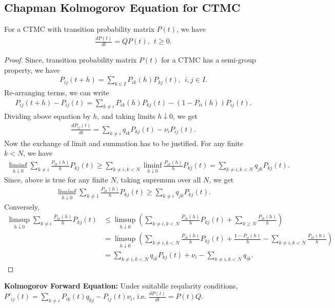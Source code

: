 \documentclass[a4paper,10pt,english]{article}
\begin{document}
\subsection{Chapman Kolmogorov Equation for CTMC}
\begin{thm} For a CTMC with transition probability matrix $P(t)$, we have
\begin{align*}
\frac{dP(t)}{dt}=QP(t), ~~t \geqslant 0.
\end{align*}
\end{thm}
\begin{proof} Since, transition probability matrix $P(t)$ for a CTMC has a semi-group property, we have
\begin{align*}
P_{ij}(t+h)=\sum_{k \in I}P_{ik}(h)P_{kj}(t),~~i,j \in I.
\end{align*}
Re-arranging terms, we can write
\begin{align*}
P_{ij}(t+h)-P_{ij}(t)=\sum_{k \neq i}P_{ik}(h)P_{kj}(t)-(1-P_{ii}(h))P_{ij}(t).
\end{align*}
Dividing above equation by $h$,  and taking limits $h \downarrow 0$, we get 
\begin{align*}
\frac{dP_{ij}(t)}{dt} = \sum_{k \neq i}q_{ik}P_{kj}(t)-\nu_iP_{ij}(t). 
\end{align*}
Now the exchange of limit and summation has to be justified. For any finite $k < N$, we have
\begin{align*}
\liminf_{h \downarrow 0} \sum_{k \neq i}\frac{P_{ik}(h)}{h}P_{kj}(t) \geq \sum_{k \neq i, k < N}\liminf_{h \downarrow 0}\frac{P_{ik}(h)}{h}P_{kj}(t) = \sum_{k \neq i, k < N}q_{jk}P_{kj}(t).
\end{align*}
Since, above is true for any finite $N$, taking supremum over all $N$, we get 
\begin{align*}
\liminf_{h \downarrow 0} \sum_{k \neq 1}\frac{P_{ik}(h)}{h}P_{kj}(t) \geq \sum_{k \neq i}q_{jk}P_{kj}(t).
\end{align*}
Conversely,
\begin{align*}
\limsup_{h \downarrow 0}\sum_{k \neq i}\frac{P_{ik}(h)}{h}P_{kj}(t) &\leq \limsup_{h \downarrow 0}\left(\sum_{k \neq i, k<N}\frac{P_{ik}(h)}{h}P_{kj}(t)+\sum_{k\geq N}\frac{P_{ik}(h)}{h}\right)\\
& = \limsup_{h \downarrow 0}\left(\sum_{k \neq i, k<N}\frac{P_{ik}(h)}{h}P_{kj}(t)+\frac{1-P_{ii}(h)}{h} -\sum_{k \neq i, k < N}\frac{P_{ik}(h)}{h} \right)\\
&= \sum_{k \neq i, k<N}q_{ik}P_{kj}(t)+\nu_i- \sum_{k \neq i, k < N}q_{ik}. %
\end{align*}
\end{proof}
\begin{thm}
\textbf{Kolmogorov Forward Equation:} Under suitablle reqularity conditions, $P'_{ij}(t)=\sum_{k \neq i}P_{ik}(t)q_{kj}-P_{ij}(t)\nu_i$, i.e. $\frac{dP(t)}{dt}=P(t)Q$.
\end{thm}
\end{document}
